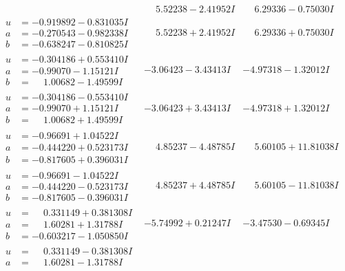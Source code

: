\documentclass[1p]{elsarticle_modified}
\theoremstyle{definition}
\begin{document}
$$\begin{array}{c|c|c}
 & \phantom{-}5.52238 - 2.41952 I & \phantom{-}6.29336 - 0.75030 I \\ \hline\begin{aligned}
u &= -0.919892 - 0.831035 I \\
a &= -0.270543 - 0.982338 I \\
b &= -0.638247 - 0.810825 I\end{aligned}
 & \phantom{-}5.52238 + 2.41952 I & \phantom{-}6.29336 + 0.75030 I \\ \hline\begin{aligned}
u &= -0.304186 + 0.553410 I \\
a &= -0.99070 - 1.15121 I \\
b &= \phantom{-}1.00682 - 1.49599 I\end{aligned}
 & -3.06423 - 3.43413 I & -4.97318 - 1.32012 I \\ \hline\begin{aligned}
u &= -0.304186 - 0.553410 I \\
a &= -0.99070 + 1.15121 I \\
b &= \phantom{-}1.00682 + 1.49599 I\end{aligned}
 & -3.06423 + 3.43413 I & -4.97318 + 1.32012 I \\ \hline\begin{aligned}
u &= -0.96691 + 1.04522 I \\
a &= -0.444220 + 0.523173 I \\
b &= -0.817605 + 0.396031 I\end{aligned}
 & \phantom{-}4.85237 - 4.48785 I & \phantom{-}5.60105 + 11.81038 I \\ \hline\begin{aligned}
u &= -0.96691 - 1.04522 I \\
a &= -0.444220 - 0.523173 I \\
b &= -0.817605 - 0.396031 I\end{aligned}
 & \phantom{-}4.85237 + 4.48785 I & \phantom{-}5.60105 - 11.81038 I \\ \hline\begin{aligned}
u &= \phantom{-}0.331149 + 0.381308 I \\
a &= \phantom{-}1.60281 + 1.31788 I \\
b &= -0.603217 - 1.050850 I\end{aligned}
 & -5.74992 + 0.21247 I & -3.47530 - 0.69345 I \\ \hline\begin{aligned}
u &= \phantom{-}0.331149 - 0.381308 I \\
a &= \phantom{-}1.60281 - 1.31788 I \\

\end{aligned}
\end{array}$$
\end{document}
